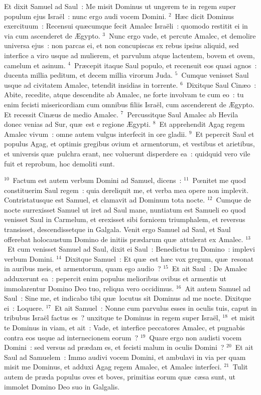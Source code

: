 \lettrine[lines=10,image=true,loversize=0.05,lraise=-0.03]{E}{}t dixit Samuel ad Saul~: Me misit Dominus ut ungerem te in regem super populum ejus Isra\"el~: nunc ergo audi vocem Domini.
${}^{2}$~H\ae c dicit Dominus exercituum~: Recensui qu\ae cumque fecit Amalec Isra\"eli~: quomodo restitit ei in via cum ascenderet de \AE gypto.
${}^{3}$~Nunc ergo vade, et percute Amalec, et demolire universa ejus~: non parcas ei, et non concupiscas ex rebus ipsius aliquid, sed interfice a viro usque ad mulierem, et parvulum atque lactentem, bovem et ovem, camelum et asinum.
${}^{4}$~Pr\ae cepit itaque Saul populo, et recensuit eos quasi agnos~: ducenta millia peditum, et decem millia virorum Juda.
${}^{5}$~Cumque venisset Saul usque ad civitatem Amalec, tetendit insidias in torrente.
${}^{6}$~Dixitque Saul Cin\ae o~: Abite, recedite, atque descendite ab Amalec, ne forte involvam te cum eo~: tu enim fecisti misericordiam cum omnibus filiis Isra\"el, cum ascenderent de \AE gypto. Et recessit Cin\ae us de medio Amalec.
${}^{7}$~Percussitque Saul Amalec ab Hevila donec venias ad Sur, qu\ae\ est e regione \AE gypti.
${}^{8}$~Et apprehendit Agag regem Amalec vivum~: omne autem vulgus interfecit in ore gladii.
${}^{9}$~Et pepercit Saul et populus Agag, et optimis gregibus ovium et armentorum, et vestibus et arietibus, et universis qu\ae\ pulchra erant, nec voluerunt disperdere ea~: quidquid vero vile fuit et reprobum, hoc demoliti sunt.


${}^{10}$~Factum est autem verbum Domini ad Samuel, dicens~:
${}^{11}$~Pœnitet me quod constituerim Saul regem~: quia dereliquit me, et verba mea opere non implevit. Contristatusque est Samuel, et clamavit ad Dominum tota nocte.
${}^{12}$~Cumque de nocte surrexisset Samuel ut iret ad Saul mane, nuntiatum est Samueli eo quod venisset Saul in Carmelum, et erexisset sibi fornicem triumphalem, et reversus transisset, descendissetque in Galgala. Venit ergo Samuel ad Saul, et Saul offerebat holocaustum Domino de initiis pr\ae darum qu\ae\ attulerat ex Amalec.
${}^{13}$~Et cum venisset Samuel ad Saul, dixit ei Saul~: Benedictus tu Domino~: implevi verbum Domini.
${}^{14}$~Dixitque Samuel~: Et qu\ae\ est h\ae c vox gregum, qu\ae\ resonat in auribus meis, et armentorum, quam ego audio~?
${}^{15}$~Et ait Saul~: De Amalec adduxerunt ea~: pepercit enim populus melioribus ovibus et armentis ut immolarentur Domino Deo tuo, reliqua vero occidimus.
${}^{16}$~Ait autem Samuel ad Saul~: Sine me, et indicabo tibi qu\ae\ locutus sit Dominus ad me nocte. Dixitque ei~: Loquere.
${}^{17}$~Et ait Samuel~: Nonne cum parvulus esses in oculis tuis, caput in tribubus Isra\"el factus es~? unxitque te Dominus in regem super Isra\"el,
${}^{18}$~et misit te Dominus in viam, et ait~: Vade, et interfice peccatores Amalec, et pugnabis contra eos usque ad internecionem eorum~?
${}^{19}$~Quare ergo non audisti vocem Domini~: sed versus ad pr\ae dam es, et fecisti malum in oculis Domini~?
${}^{20}$~Et ait Saul ad Samuelem~: Immo audivi vocem Domini, et ambulavi in via per quam misit me Dominus, et adduxi Agag regem Amalec, et Amalec interfeci.
${}^{21}$~Tulit autem de pr\ae da populus oves et boves, primitias eorum qu\ae\ c\ae sa sunt, ut immolet Domino Deo suo in Galgalis.


